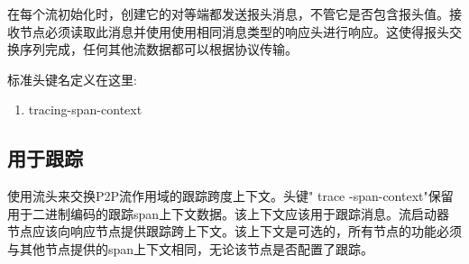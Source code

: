 在每个流初始化时，创建它的对等端都发送报头消息，不管它是否包含报头值。接收节点必须读取此消息并使用使用相同消息类型的响应头进行响应。这使得报头交换序列完成，任何其他流数据都可以根据协议传输。

标准头键名定义在这里:

\begin{enumerate}
\item tracing-span-context
\end{enumerate}


\subsection{用于跟踪}

使用流头来交换P2P流作用域的跟踪跨度上下文。头键" trace -span-context"保留用于二进制编码的跟踪span上下文数据。该上下文应该用于跟踪消息。流启动器节点应该向响应节点提供跟踪跨上下文。该上下文是可选的，所有节点的功能必须与其他节点提供的span上下文相同，无论该节点是否配置了跟踪。
